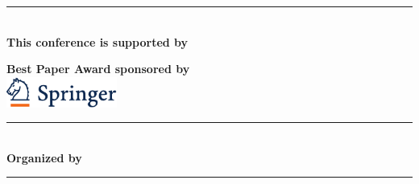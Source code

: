 \begin{center}
\vspace{5mm}
\rule{12cm}{1pt}\\[12pt]
\textsf{\textbf{\Large This conference is supported by}}\\
\vspace{2mm}

\hspace{\separationwidth}



\vspace{7mm}
\textsf{\textbf{\Large Best Paper Award sponsored by}}\\
\vspace{3mm}
\includegraphics[height=1cm]{local_img/sponsors/Springer_cmyk}
\\

\rule{12cm}{1pt}\\[10pt]
\textsf{\textbf{\Large Organized by }}
\hspace{2mm}

\vspace{5mm}
\rule{12cm}{1pt}\\[10pt]
\end{center}
